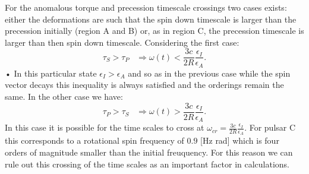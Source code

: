 For the anomalous torque and precession timescale crossings two cases exists:
either the deformations are such that the spin down timescale is larger than
the precession initially (region A and B) or, as in region C, the precession
timescale is larger than then spin down timescale. Considering the first case:
\begin{equation}
\tau_{S}>\tau_{P} \;\;\; 
\Rightarrow \omega(t)<\frac{3c}{2R}\frac{\epsilon_{I}}{\epsilon_{A}}.
\end{equation}•
In this particular state $\epsilon_{I}>\epsilon_{A}$ and so as in the previous
case while the spin vector decays this inequality is always satisfied and the
orderings remain the same. In the other case we have:
\begin{equation}
\tau_{P}>\tau_{S} \;\;\; 
\Rightarrow \omega(t)>\frac{3c}{2R}\frac{\epsilon_{I}}{\epsilon_{A}}.
\end{equation}
In this case it is possible for the time scales to cross at
$\omega_{cr}=\frac{3c}{2R}\frac{\epsilon_{I}}{\epsilon_{A}}$. For pulsar C this
corresponds to a rotational spin frequency of $0.9$ [Hz rad] which is four
orders of magnitude smaller than the initial freuquency. For this reason we can
rule out this crossing of the time scales as an important factor in
calculations. 


